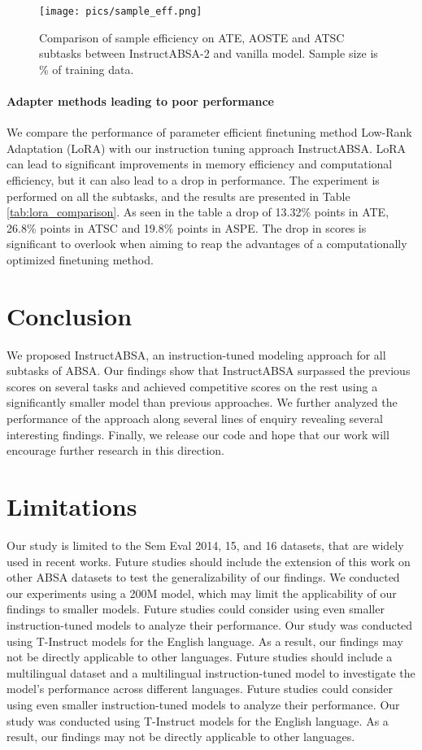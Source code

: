 \documentclass[11pt]{article}
\newcommand{\name}{\textsc{I}nstruct\textsc{ABSA}\xspace}
\begin{document}
\begin{figure}[t!]
	\centering
	\texttt{[image: pics/sample\_eff.png]}
	\caption{Comparison of sample efficiency on ATE, AOSTE and ATSC subtasks between \name{}-2 and vanilla model. Sample size is \% of training data.}
	\label{fig:sample_eff}
\end{figure} 

\paragraph{Adapter methods leading to poor performance} 
 We compare the performance of parameter efficient finetuning method Low-Rank Adaptation (LoRA)\cite{hu2021lora} with our instruction tuning approach \name{}. LoRA can lead to significant improvements in memory efficiency and computational efficiency, but it can also lead to a drop in performance.
The experiment is performed on all the subtasks, and the results are presented in Table \ref{tab:lora_comparison}.
As seen in the table a drop of 13.32\% points in ATE, 26.8\% points in ATSC and 19.8\% points in ASPE. 
The drop in scores is significant to overlook when aiming to reap the advantages of a computationally optimized finetuning method.



\section{Conclusion}
We proposed \name{}, an instruction-tuned modeling approach for all subtasks of ABSA. 
Our findings show that \name{} surpassed the previous scores on several tasks and achieved competitive scores on the rest using a significantly smaller model than previous approaches. 
We further analyzed the performance of the approach along several lines of enquiry revealing several interesting findings. 
Finally, we release our code and hope that our work will encourage further research in this direction.

\section*{Limitations}
Our study is limited to the Sem Eval 2014, 15, and 16 datasets, that are widely used in recent works. 
Future studies should include the extension of this work on other ABSA datasets to test the generalizability of our findings.
We conducted our experiments using a 200M model, which may limit the applicability of our findings to smaller models. 
Future studies could consider using even smaller instruction-tuned models to analyze their performance.
Our study was conducted using T-Instruct models for the English language. 
As a result, our findings may not be directly applicable to other languages. 
Future studies should include a multilingual dataset and a multilingual instruction-tuned model to investigate the model's performance across different languages.
Future studies could consider using even smaller instruction-tuned models to analyze their performance.
Our study was conducted using T-Instruct models for the English language. 
As a result, our findings may not be directly applicable to other languages. 
\end{document}
